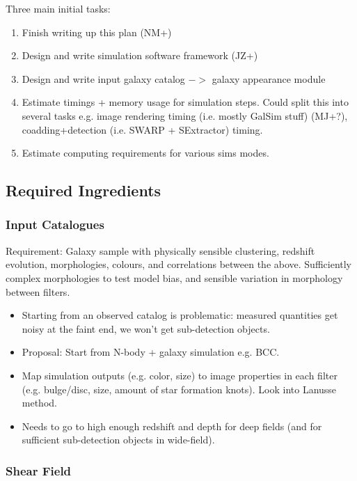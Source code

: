 \documentclass[\docopts]{\docclass}
\begin{document}
Three main initial tasks:
\begin{enumerate}
\item{Finish writing up this plan (NM+)}
\item{Design and write simulation software framework (JZ+)}
\item{Design and write input galaxy catalog 
$->$ galaxy appearance module}
\item{Estimate timings + memory usage for simulation steps. Could split this into several tasks e.g. image rendering timing (i.e. mostly GalSim stuff) (MJ+?), coadding+detection (i.e. SWARP + SExtractor) timing.}
\item{Estimate computing requirements for various sims modes.}
\end{enumerate}

\subsection{Required Ingredients}

\subsubsection{Input Catalogues}

Requirement: Galaxy sample with physically sensible clustering, redshift evolution, morphologies, colours, and correlations between the above. Sufficiently complex morphologies to test model bias, and sensible variation in morphology between filters. 

\begin{itemize}
\item Starting from an observed catalog is problematic: measured quantities get noisy at the faint end, we won't get sub-detection objects.
\item Proposal: Start from N-body + galaxy simulation e.g. BCC.
\item Map simulation outputs (e.g. color, size) to image properties in each filter (e.g. bulge/disc, size, amount of star formation knots). Look into Lanusse method.
\item Needs to go to high enough redshift and depth for deep fields (and for sufficient sub-detection objects in wide-field).
\end{itemize}

\subsubsection{Shear Field}
\end{document}
